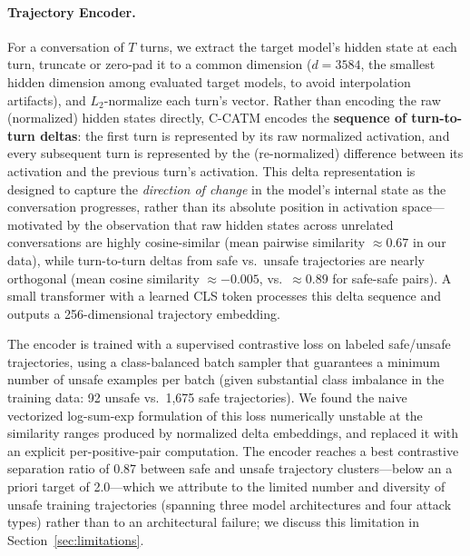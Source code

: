 \documentclass[11pt]{article}
\begin{document}
\paragraph{Trajectory Encoder.} For a conversation of $T$ turns, we extract the target model's hidden state at each turn, truncate or zero-pad it to a common dimension ($d=3584$, the smallest hidden dimension among evaluated target models, to avoid interpolation artifacts), and $L_2$-normalize each turn's vector. Rather than encoding the raw (normalized) hidden states directly, C-CATM encodes the \textbf{sequence of turn-to-turn deltas}: the first turn is represented by its raw normalized activation, and every subsequent turn is represented by the (re-normalized) difference between its activation and the previous turn's activation. This delta representation is designed to capture the \emph{direction of change} in the model's internal state as the conversation progresses, rather than its absolute position in activation space---motivated by the observation that raw hidden states across unrelated conversations are highly cosine-similar (mean pairwise similarity $\approx 0.67$ in our data), while turn-to-turn deltas from safe vs.\ unsafe trajectories are nearly orthogonal (mean cosine similarity $\approx -0.005$, vs.\ $\approx 0.89$ for safe-safe pairs). A small transformer with a learned CLS token processes this delta sequence and outputs a 256-dimensional trajectory embedding.

The encoder is trained with a supervised contrastive loss \citep{khosla2020supcon} on labeled safe/unsafe trajectories, using a class-balanced batch sampler that guarantees a minimum number of unsafe examples per batch (given substantial class imbalance in the training data: 92 unsafe vs.\ 1{,}675 safe trajectories). We found the naive vectorized log-sum-exp formulation of this loss numerically unstable at the similarity ranges produced by normalized delta embeddings, and replaced it with an explicit per-positive-pair computation. The encoder reaches a best contrastive separation ratio of 0.87 between safe and unsafe trajectory clusters---below an a priori target of 2.0---which we attribute to the limited number and diversity of unsafe training trajectories (spanning three model architectures and four attack types) rather than to an architectural failure; we discuss this limitation in Section~\ref{sec:limitations}.
\end{document}
